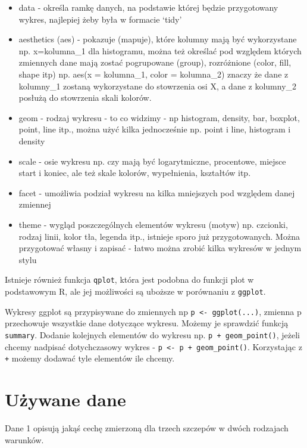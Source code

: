 \documentclass[
]{book}
\begin{document}
\begin{itemize}
\item
  data - określa ramkę danych, na podstawie której będzie przygotowany wykres, najlepiej żeby była w formacie `tidy'
\item
  aesthetics (aes) - pokazuje (mapuje), które kolumny mają być wykorzystane np. x=kolumna\_1 dla histogramu, można też określać pod względem których zmiennych dane mają zostać pogrupowane (group), rozróżnione (color, fill, shape itp) np. aes(x = kolumna\_1, color = kolumna\_2) znaczy że dane z kolumny\_1 zostaną wykorzystane do stowrzenia osi X, a dane z kolumny\_2 posłużą do stowrzenia skali kolorów.
\item
  geom - rodzaj wykresu - to co widzimy - np histogram, density, bar, boxplot, point, line itp., można użyć kilka jednocześnie np. point i line, histogram i density
\item
  scale - osie wykresu np. czy mają być logarytmiczne, procentowe, miejsce start i koniec, ale też skale kolorów, wypełnienia, kształtów itp.
\item
  facet - umożliwia podział wykresu na kilka mniejszych pod względem danej zmiennej
\item
  theme - wygląd poszczególnych elementów wykresu (motyw) np. czcionki, rodzaj linii, kolor tła, legenda itp., istnieje sporo już przygotowanych. Można przygotować własny i zapisać - łatwo można zrobić kilka wykresów w jednym stylu
\end{itemize}

Istnieje również funkcja \texttt{qplot}, która jest podobna do funkcji plot w podstawowym R, ale jej możliwości są uboższe w porównaniu z \texttt{ggplot}.

Wykresy ggplot są przypisywane do zmiennych np \texttt{p\ \textless{}-\ ggplot(...)}, zmienna p przechowuje wszystkie dane dotyczące wykresu. Możemy je sprawdzić funkcją \texttt{summary}. Dodanie kolejnych elementów do wykresu np. \texttt{p\ +\ geom\_point()}, jeżeli chcemy nadpisać dotychczasowy wykres - \texttt{p\ \textless{}-\ p\ +\ geom\_point()}. Korzystając z \texttt{+} możemy dodawać tyle elementów ile chcemy.

\hypertarget{uux17cywane-dane}{%
\section{Używane dane}\label{uux17cywane-dane}}

Dane 1 opisują jakąś cechę zmierzoną dla trzech szczepów w dwóch rodzajach warunków.
\end{document}
